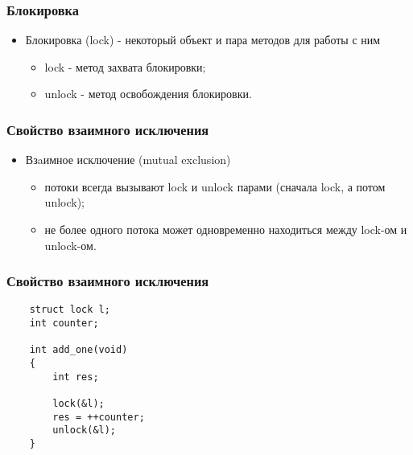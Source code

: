 \begin{frame}
\frametitle{Блокировка}
\begin{itemize}
    \item<1->Блокировка (lock) - некоторый объект и пара методов для работы с
         ним
    \begin{itemize}
        \item<2->lock - метод захвата блокировки;
        \item<3->unlock - метод освобождения блокировки.
    \end{itemize}
\end{itemize}
\end{frame}

\begin{frame}
\frametitle{Свойство взаимного исключения}
\begin{itemize}
    \item<1->Взaимное исключение (mutual exclusion)
    \begin{itemize}
        \item<2->потоки всегда вызывают lock и unlock парами (сначала lock,
             а потом unlock);
        \item<3->не более одного потока может одновременно находиться между
             lock-ом и unlock-ом.
    \end{itemize}
\end{itemize}
\end{frame}

\begin{frame}[fragile]
\frametitle{Свойство взаимного исключения}
\begin{lstlisting}
    struct lock l;
    int counter;

    int add_one(void)
    {
        int res;

        lock(&l);
        res = ++counter;
        unlock(&l);
    }
\end{lstlisting}
\end{frame}

